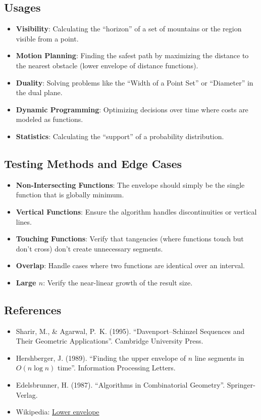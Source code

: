 \subsection{Usages}
\begin{itemize}
    \item \textbf{Visibility}: Calculating the ``horizon'' of a set of mountains or the region visible from a point.
    \item \textbf{Motion Planning}: Finding the safest path by maximizing the distance to the nearest obstacle (lower envelope of distance functions).
    \item \textbf{Duality}: Solving problems like the ``Width of a Point Set'' or ``Diameter'' in the dual plane.
    \item \textbf{Dynamic Programming}: Optimizing decisions over time where costs are modeled as functions.
    \item \textbf{Statistics}: Calculating the ``support'' of a probability distribution.
\end{itemize}

\subsection{Testing Methods and Edge Cases}
\begin{itemize}
    \item \textbf{Non-Intersecting Functions}: The envelope should simply be the single function that is globally minimum.
    \item \textbf{Vertical Functions}: Ensure the algorithm handles discontinuities or vertical lines.
    \item \textbf{Touching Functions}: Verify that tangencies (where functions touch but don't cross) don't create unnecessary segments.
    \item \textbf{Overlap}: Handle cases where two functions are identical over an interval.
    \item \textbf{Large $n$}: Verify the near-linear growth of the result size.
\end{itemize}

\subsection{References}
\begin{itemize}
    \item Sharir, M., \& Agarwal, P.~K. (1995). ``Davenport--Schinzel Sequences and Their Geometric Applications''. Cambridge University Press.
    \item Hershberger, J. (1989). ``Finding the upper envelope of $n$ line segments in $O(n \log n)$ time''. Information Processing Letters.
    \item Edelsbrunner, H. (1987). ``Algorithms in Combinatorial Geometry''. Springer-Verlag.
    \item Wikipedia: \href{https://en.wikipedia.org/wiki/Lower_envelope}{Lower envelope}
\end{itemize}

